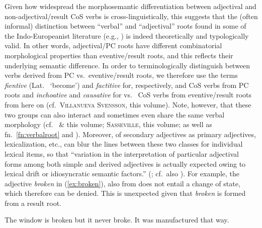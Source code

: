 \documentclass[output=paper,colorlinks,citecolor=brown]{langscibook}
\begin{document}
Given how widespread the morphosemantic differentiation between adjectival and non-adjectival/result CoS  verbs is cross-linguistically, this suggests that the (often informal) distinction between ``verbal'' and ``adjectival'' roots   found in some of the Indo-Europeanist literature (e.g., \citealt{Nussbaum2022}) is indeed theoretically and typologically valid. In other words, adjectival/PC roots have different combinatorial morphological properties than eventive/result roots, and this reflects their underlying semantic difference.  In order to terminologically distinguish between verbs derived from PC vs.\ eventive/result roots, we therefore use the terms \emph{fientive} (Lat.\  `become') and \emph{factitive} for, respectively,  and  CoS  verbs from PC roots and \emph{inchoative} and \emph{causative} for  vs.\  CoS  verbs from eventive/result roots from here on (cf.\ \textsc{Villanueva Svensson}, this volume). Note, however, that these two groups can also interact and sometimes even share the same verbal morphology (cf.\ \citealt{Rau2013} \& this volume; \textsc{Sasseville}, this volume; as well as fn.\ \ref{fn:verbalroot} and ). Moreover,  of secondary adjectives as primary adjectives,  lexicalization, etc., can blur the lines between these two classes for individual lexical items, so that ``variation in the interpretation
of particular adjectival forms among both simple and derived adjectives is actually expected owing to lexical drift or idiosyncratic semantic factors.'' (\citealt[449]{Beaversetal2021}; cf.\ also \citealt[71--73]{BeaversKoontz2020}). For example, the adjective \textit{broken} in (\ref{ex:broken}), also from \citet[449]{Beaversetal2021} does not entail a change of state, which therefore can be denied. This is unexpected given that \textit{broken} is formed from a result root. 

\begin{exe}
    \ex The window is broken but it never broke. It was manufactured that way. \label{ex:broken}
\end{exe}
\end{document}
